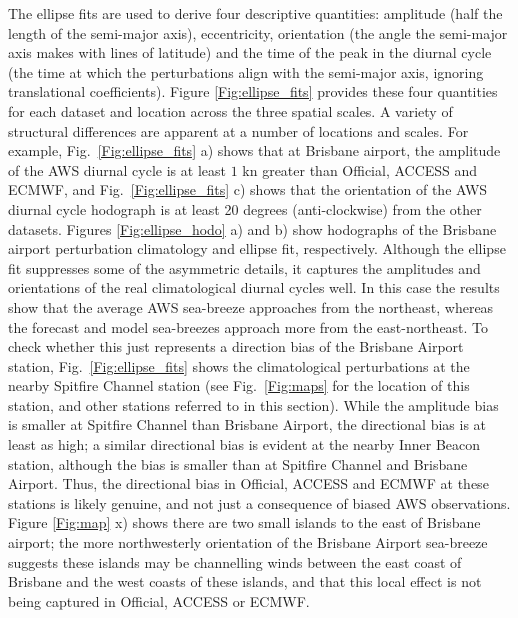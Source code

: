 \documentclass{ametsoc}
\begin{document}
The ellipse fits are used to derive four descriptive quantities: amplitude (half the length of the semi-major axis), eccentricity, orientation (the angle the semi-major axis makes with lines of latitude) and the time of the peak in the diurnal cycle (the time at which the perturbations align with the semi-major axis, ignoring translational coefficients). Figure \ref{Fig:ellipse_fits} provides these four quantities for each dataset and location across the three spatial scales. A variety of structural differences are apparent at a number of locations and scales. For example, Fig.~\ref{Fig:ellipse_fits} a) shows that at Brisbane airport, the amplitude of the AWS diurnal cycle is at least $1$ kn greater than Official, ACCESS and ECMWF, and Fig.~\ref{Fig:ellipse_fits} c) shows that the orientation of the AWS diurnal cycle hodograph is at least 20 degrees (anti-clockwise) from the other datasets. Figures \ref{Fig:ellipse_hodo} a) and b) show hodographs of the Brisbane airport perturbation climatology and ellipse fit, respectively. Although the ellipse fit suppresses some of the asymmetric details, it captures the amplitudes and orientations of the real climatological diurnal cycles well. In this case the results show that the average AWS sea-breeze approaches from the northeast, whereas the forecast and model sea-breezes approach more from the east-northeast. To check whether this just represents a direction bias of the Brisbane Airport station, Fig.~\ref{Fig:ellipse_fits} shows the climatological perturbations at the nearby Spitfire Channel station (see Fig.~\ref{Fig:maps} for the location of this station, and other stations referred to in this section). While the amplitude bias is smaller at Spitfire Channel than Brisbane Airport, the directional bias is at least as high; a similar directional bias is evident at the nearby Inner Beacon station, although the bias is smaller than at Spitfire Channel and Brisbane Airport. Thus, the directional bias in Official, ACCESS and ECMWF at these stations is likely genuine, and not just a consequence of biased AWS observations. Figure \ref{Fig:map} x) shows there are two small islands to the east of Brisbane airport; the more northwesterly orientation of the Brisbane Airport sea-breeze suggests these islands may be channelling winds between the east coast of Brisbane and the west coasts of these islands, and that this local effect is not being captured in Official, ACCESS or ECMWF.            
\end{document}
